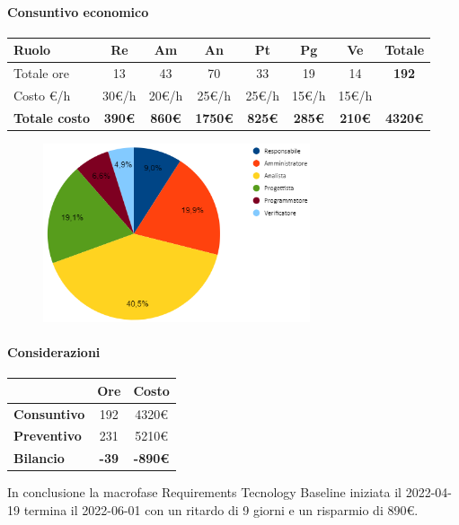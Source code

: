 \paragraph{Consuntivo economico}
\begin{center}
	\renewcommand{\arraystretch}{1.8}
	\begin{tabular}{ |m{6em}|c|c|c|c|c|c|c| }
	\hline
	\textbf{Ruolo} & \textbf{Re} & \textbf{Am} &  \textbf{An} &  \textbf{Pt} &  \textbf{Pg} &  \textbf{Ve} &  \textbf{Totale}\\
    \hline
    Totale ore & 13 & 43 & 70 & 33 & 19 & 14 & \textbf{192}\\
    \hline
    Costo \euro/h & 30\euro/h & 20\euro/h & 25\euro/h & 25\euro/h & 15\euro/h & 15\euro/h & \\
    \hline
    \textbf{Totale costo} & \textbf{390\euro} & \textbf{860\euro} &  \textbf{1750\euro} &  \textbf{825\euro} &  \textbf{285\euro} &  \textbf{210\euro} &  \textbf{4320\euro}\\
    \hline
	\end{tabular}

    \begin{figure}[H]
        \centering\includegraphics[width=0.7\textwidth, height=0.7\textheight, keepaspectratio]{images/consuntivo/RTB-costo.png}
    \end{figure}
\end{center}

\paragraph{Considerazioni} \hfill \break
\begin{center}
	\renewcommand{\arraystretch}{1.8}
	\begin{tabular}{ | l |c|c| }
    \hline
    & \textbf{Ore} & \textbf{Costo} \\
	\hline
    \textbf{Consuntivo} & 192 & 4320\euro \\
    \hline
    \textbf{Preventivo} & 231 & 5210\euro \\
    \hline
    \textbf{Bilancio} & \textbf{-39} & \textbf{-890\euro} \\
    \hline
    \end{tabular}
\end{center}
In conclusione la macrofase Requirements Tecnology Baseline iniziata il 2022-04-19 termina il 2022-06-01 con un ritardo di 9 giorni e un risparmio di 890\euro.

